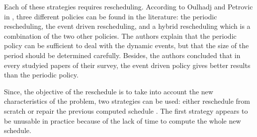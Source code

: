 \documentclass[a4paper,10pt]{article}
\begin{document}
Each of these strategies requires rescheduling. According to Oulhadj and Petrovic in \cite{Ouelhadj2009}, three different policies can be found in the literature: the periodic rescheduling, the event driven rescheduling, and a hybrid rescheduling which is a combination of the two other policies. The authors explain that the periodic policy can be sufficient to deal with the dynamic events, but that the size of the period should be determined carefully. Besides, the authors concluded that in every studyied papers of their survey, the event driven policy gives better results than the periodic policy.

Since, the objective of the reschedule is to take into account the new characteristics of the problem, two strategies can be used: either reschedule from scratch or repair the previous computed schedule \cite{Ouelhadj2009}. The first strategy appears to be unusable in practice because of the lack of time to compute the whole new schedule.
\end{document}
